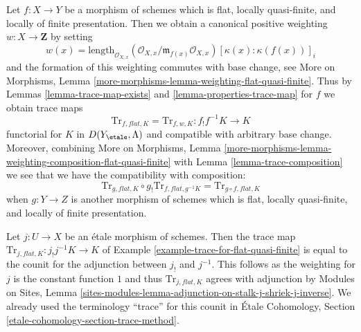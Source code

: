 \begin{example}
\label{example-trace-for-flat-quasi-finite}
Let $f : X \to Y$ be a morphism of schemes which is flat,
locally quasi-finite, and locally of finite presentation.
Then we obtain a canonical positive weighting $w : X \to \mathbf{Z}$
by setting
$$
w(x) = \text{length}_{\mathcal{O}_{X, x}}
(\mathcal{O}_{X, x}/\mathfrak m_{f(x)} \mathcal{O}_{X, x})
[\kappa(x) : \kappa(f(x))]_i
$$
and the formation of this weighting commutes with base change, see
More on Morphisms, Lemma
\ref{more-morphisms-lemma-weighting-flat-quasi-finite}.
Thus by Lemmas \ref{lemma-trace-map-exists} and
\ref{lemma-properties-trace-map} for $f$ we obtain trace maps
$$
\text{Tr}_{f, \mathit{flat}, K} =
\text{Tr}_{f, w, K} :
f_!f^{-1}K
\longrightarrow
K
$$
functorial for $K$ in $D(Y_\etale, \Lambda)$ and compatible
with arbitrary base change. Moreover, combining
More on Morphisms, Lemma
\ref{more-morphisms-lemma-weighting-composition-flat-quasi-finite}
with Lemma \ref{lemma-trace-composition} we see that
we have the compatibility with composition:
$$
\text{Tr}_{g, \mathit{flat}, K} \circ
g_!\text{Tr}_{f, \mathit{flat}, g^{-1}K} =
\text{Tr}_{g \circ f, \mathit{flat}, K}
$$
when $g : Y \to Z$ is another morphism of schemes which is flat,
locally quasi-finite, and locally of finite presentation.
\end{example}

\begin{remark}
\label{remark-trace-etale-counit}
Let $j : U \to X$ be an \'etale morphism of schemes. Then the trace
map $\text{Tr}_{j, \mathit{flat}, K} : j_!j^{-1}K \to K$ of
Example \ref{example-trace-for-flat-quasi-finite} is equal to the
counit for the adjunction between $j_!$ and $j^{-1}$.
This follows as the weighting for $j$ is the constant function $1$
and thus $\text{Tr}_{j, \mathit{flat}, K}$ agrees with adjunction
by Modules on Sites, Lemma
\ref{sites-modules-lemma-adjunction-on-stalk-j-shriek-j-inverse}.
We already used the terminology ``trace'' for this counit in
\'Etale Cohomology, Section \ref{etale-cohomology-section-trace-method}.
\end{remark}

